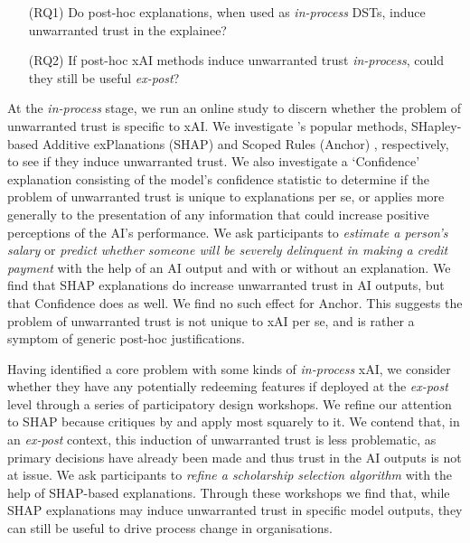 \begin{enumerate}
    \item[(RQ1)] Do post-hoc explanations, when used as \emph{in-process} DSTs, induce unwarranted trust in the explainee?
    \item[(RQ2)] If post-hoc xAI methods induce unwarranted trust \emph{in-process}, could they still be useful \emph{ex-post}?
\end{enumerate}

At the \emph{in-process} stage, we run an online study to discern whether the problem of unwarranted trust is specific to xAI. We investigate \textcite{Lundberg-and-Lee,Ribeiro-et-al-anchors}'s popular methods, SHapley-based Additive exPlanations (SHAP) \cite{Lundberg-and-Lee} and Scoped Rules (Anchor) \cite{Ribeiro-et-al-anchors}, respectively, to see if they induce unwarranted trust. We also investigate a `Confidence' explanation consisting of the model's confidence statistic to determine if the problem of unwarranted trust is unique to explanations per se, or applies more generally to the presentation of any information that could increase positive perceptions of the AI's performance. We ask participants to \emph{estimate a person's salary} \cite{Kohavi} or \emph{predict whether someone will be severely delinquent in making a credit payment} \cite{GiveMeSomeCredit} with the help of an AI output and with or without an explanation. We find that SHAP explanations do increase unwarranted trust in AI outputs, but that Confidence does as well. We find no such effect for Anchor. This suggests the problem of unwarranted trust is not unique to xAI per se, and is rather a symptom of generic post-hoc justifications.

Having identified a core problem with some kinds of \emph{in-process} xAI, we consider whether they have any potentially redeeming features if deployed at the \emph{ex-post} level through a series of participatory design workshops. We refine our attention to SHAP because critiques by \textcite{Lipton} and \textcite{Miller_2023} apply most squarely to it. We contend that, in an \emph{ex-post} context, this induction of unwarranted trust is less problematic, as primary decisions have already been made and thus trust in the AI outputs is not at issue. We ask participants to \emph{refine a scholarship selection algorithm} with the help of SHAP-based explanations. Through these workshops we find that, while SHAP explanations may induce unwarranted trust in specific model outputs, they can still be useful to drive process change in organisations.

